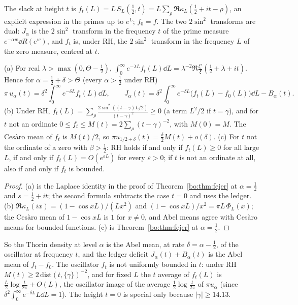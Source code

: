 The slack at height $t$ is $f_t(L)=L\,S_L(\frac12,t)=L\sum_\rho\Re\kappa_L(\frac12+it-\rho)$, an explicit expression in the primes up to $e^L$; $f_0=f$. The two $2\sin^2$ transforms are dual: $J_\alpha$ is the $2\sin^2$ transform in the frequency $t$ of the prime measure $e^{-\alpha w}\dd R(e^w)$, and $f_t$ is, under RH, the $2\sin^2$ transform in the frequency $L$ of the zero measure, centred at $t$.

\begin{theorem}\label{bo:thm:freq}
(a) For real $\lambda>\max(0,\Theta-\frac12)$, $\int_0^\infty e^{-\lambda L}f_t(L)\dd L=\lambda^{-2}\Re\frac{\xi'}{\xi}(\frac12+\lambda+it)$. Hence for $\alpha=\frac12+\delta>\Theta$ (every $\alpha>\frac12$ under RH)
\[
\pi\,u_\alpha(t)=\delta^2\int_0^\infty e^{-\delta L}f_t(L)\dd L,\qquad J_\alpha(t)=\delta^2\int_0^\infty e^{-\delta L}\bigl(f_t(L)-f_0(L)\bigr)\dd L-B_\alpha(t).
\]
(b) Under RH, $f_t(L)=\sum_\rho\frac{2\sin^2((t-\gamma)L/2)}{(t-\gamma)^2}\ge0$ (a term $L^2/2$ if $t=\gamma$), and for $t$ not an ordinate $0\le f_t\le M(t)=2\sum_\rho(t-\gamma)^{-2}$, with $M(0)=M$. The Ces\`aro mean of $f_t$ is $M(t)/2$, so $\pi u_{1/2+\delta}(t)=\frac\delta2M(t)+o(\delta)$.
(c) For $t$ not the ordinate of a zero with $\beta>\frac12$: RH holds if and only if $f_t(L)\ge0$ for all large $L$, if and only if $f_t(L)=O(e^{\varepsilon L})$ for every $\varepsilon>0$; if $t$ is not an ordinate at all, also if and only if $f_t$ is bounded.
\end{theorem}

\begin{proof}
(a) is the Laplace identity in the proof of Theorem~\ref{bo:thm:fejer} at $\alpha=\frac12$ and $s=\frac12+it$; the second formula subtracts the case $t=0$ and uses the ledger. (b) $\Re\kappa_L(ix)=(1-\cos xL)/(Lx^2)$ and $(1-\cos xL)/x^2=\pi L\,\Phi_L(x)$; the Ces\`aro mean of $1-\cos xL$ is $1$ for $x\ne0$, and Abel means agree with Ces\`aro means for bounded functions. (c) is Theorem~\ref{bo:thm:fejer} at $\alpha=\frac12$.
\end{proof}

So the Thorin density at level $\alpha$ is the Abel mean, at rate $\delta=\alpha-\frac12$, of the oscillator at frequency $t$, and the ledger deficit $J_\alpha(t)+B_\alpha(t)$ is the Abel mean of $f_t-f_0$. The oscillator $f_t$ is not uniformly bounded in $t$: under RH $M(t)\ge2\,\mathrm{dist}(t,\{\gamma\})^{-2}$, and for fixed $L$ the $t$ average of $f_t(L)$ is $\frac L2\log\frac t{2\pi}+O(L)$, the oscillator image of the average $\frac12\log\frac t{2\pi}$ of $\pi u_\alpha$ (since $\delta^2\int_0^\infty e^{-\delta L}L\dd L=1$). The height $t=0$ is special only because $|\gamma|\ge14.13$.

